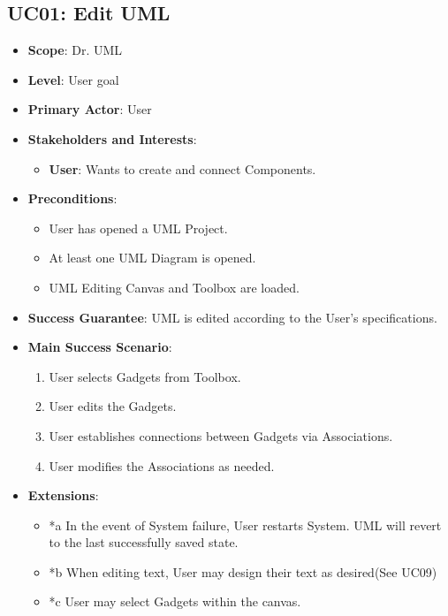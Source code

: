 \documentclass[12pt]{article}
\begin{document}
    \subsection{UC01: Edit UML}
    \begin{itemize}
        \item \textbf{Scope}: Dr. UML
        \item \textbf{Level}: User goal
        \item \textbf{Primary Actor}: User
        \item \textbf{Stakeholders and Interests}:
        \begin{itemize}
            \item \textbf{User}: Wants to create and connect Components.
        \end{itemize}
        \item \textbf{Preconditions}:
        \begin{itemize}
            \item User has opened a UML Project.
            \item At least one UML Diagram is opened.
            \item UML Editing Canvas and Toolbox are loaded.
        \end{itemize}
        \item \textbf{Success Guarantee}: UML is edited according to the User’s specifications.
        \item \textbf{Main Success Scenario}:
        \begin{enumerate}
            \item User selects Gadgets from Toolbox.
            \item User edits the Gadgets.
            \item User establishes connections between Gadgets via Associations.
            \item User modifies the Associations as needed.
        \end{enumerate}
        \item \textbf{Extensions}:
        \begin{itemize}
            \item *a In the event of System failure, User restarts System.
            UML will revert to the last successfully saved state.
            \item *b When editing text, User may design their text as desired(See UC09)
            \item *c User may select Gadgets within the canvas.

\end{itemize}
\end{itemize}
\end{document}
